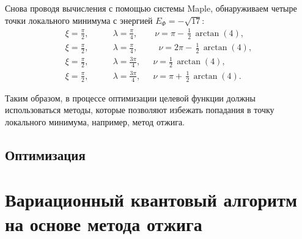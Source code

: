 \documentclass[a4paper]{report}
\begin{document}
Снова проводя вычисления с помощью системы Maple, обнаруживаем четыре точки локального минимума с энергией ${E_\Phi=-\sqrt{17}}$:
\begin{align*}
\xi=\frac{\pi}{2}, &\qquad\lambda=\frac{\pi}{4}, \qquad \nu=\pi-\,\frac{1}{2}\,\arctan(4),\\
\xi=\frac{\pi}{2}, &\qquad\lambda=\frac{\pi}{4}, \qquad\:\! \!\!\:\nu=2\pi-\,\frac{1}{2}\,\arctan(4),\\
\xi=\frac{\pi}{2}, &\qquad\lambda=\frac{3\pi}{4}, \quad\;\, \nu=\frac{1}{2}\,\arctan(4),\\
\xi=\frac{\pi}{2}, &\qquad\lambda=\frac{3\pi}{4}, \quad\;\, \nu=\pi+\,\frac{1}{2}\,\arctan(4).
\end{align*}

Таким образом, в процессе оптимизации целевой функции должны использоваться методы, которые позволяют избежать попадания в точку локального минимума, например, метод отжига.

\section{Оптимизация}


\chapter{Вариационный квантовый алгоритм на основе метода отжига}

\end{document}
